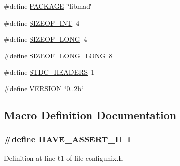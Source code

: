 \begin{DoxyCompactItemize}
\item 
\#define \hyperlink{lib-src_2libmad_2configunix_8h_aca8570fb706c81df371b7f9bc454ae03}{P\+A\+C\+K\+A\+GE}~\char`\"{}libmad\char`\"{}
\item 
\#define \hyperlink{lib-src_2libmad_2configunix_8h_a44184cf844a916eee78598ab35fc966b}{S\+I\+Z\+E\+O\+F\+\_\+\+I\+NT}~4
\item 
\#define \hyperlink{lib-src_2libmad_2configunix_8h_a22aece5d034fd9040a3d01c3797fdfe7}{S\+I\+Z\+E\+O\+F\+\_\+\+L\+O\+NG}~4
\item 
\#define \hyperlink{lib-src_2libmad_2configunix_8h_acd1ddb89a6f7f17d1c152499173c3eef}{S\+I\+Z\+E\+O\+F\+\_\+\+L\+O\+N\+G\+\_\+\+L\+O\+NG}~8
\item 
\#define \hyperlink{lib-src_2libmad_2configunix_8h_a550e5c272cc3cf3814651721167dcd23}{S\+T\+D\+C\+\_\+\+H\+E\+A\+D\+E\+RS}~1
\item 
\#define \hyperlink{lib-src_2libmad_2configunix_8h_a1c6d5de492ac61ad29aec7aa9a436bbf}{V\+E\+R\+S\+I\+ON}~\char`\"{}0..\+2b\char`\"{}
\end{DoxyCompactItemize}


\subsection{Macro Definition Documentation}
\subsubsection[{\texorpdfstring{H\+A\+V\+E\+\_\+\+A\+S\+S\+E\+R\+T\+\_\+H}{HAVE_ASSERT_H}}]{\setlength{\rightskip}{0pt plus 5cm}\#define H\+A\+V\+E\+\_\+\+A\+S\+S\+E\+R\+T\+\_\+H~1}\hypertarget{lib-src_2libmad_2configunix_8h_ad0eabe2e5407bc73450eb15b657983cd}{}\label{lib-src_2libmad_2configunix_8h_ad0eabe2e5407bc73450eb15b657983cd}


Definition at line 61 of file configunix.\+h.

